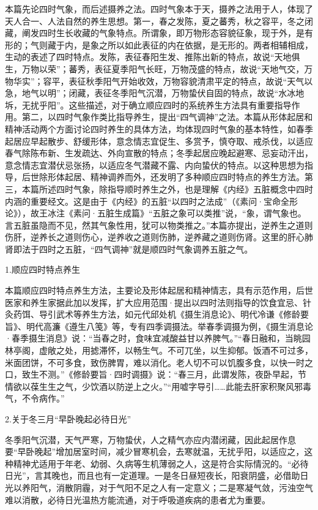 \documentclass[draft,12pt]{ctexbook}
\begin{document}


本篇先论四时气象，而后述摄养之法。四时气象本于天，摄养之法用于人，体现了天人合一、人法自然的养生思想。第一，春之发陈，夏之蕃秀，秋之容平，冬之闭藏，阐发四时生长收藏的气象特点。所谓象，即万物形态容貌征象，现于外，是有形的；气则藏于内，是象之所以如此表征的内在依据，是无形的。两者相辅相成，生动的表述了四时特点。发陈，表征春阳生发、推陈出新的特点，故说“天地俱生，万物以荣”；蕃秀，表征夏季阳气长旺，万物茂盛的特点，故说“天地气交，万物华实”；容平，表征秋季阳气开始收效，万物容貌清肃平定的特点，故说“天气以急，地气以明”；闭藏，表征冬季阳气沉潜，万物蛰伏自固的特点，故说“水冰地坼，无扰乎阳”。这些描述，对于确立顺应四时的系统养生方法具有重要指导作用。第二，以四时气象作类比指导养生，提出“四气调神”之法。本篇从形体起居和精神活动两个方面讨论四时养生的具体方法，均体现四时气象的基本特性，如春季起居应早起散步、舒缓形体，意念情志宜促生、多赏予，慎夺取、戒杀伐，以适应春气除陈布新、生发疏达、外向宣散的特点；冬季起居应晚起避寒、忌妄动汗出，意念情志宜潜伏忌张扬，以适应冬气潜藏不露、内向蛰伏的特点。以这种思想为指导，后世除形体起居、精神调养而外，还发明了多种顺应四时特点的养生方法。第三，本篇所述四时气象，除指导顺时养生之外，也是理解《内经》五脏概念中四时内涵的重要经文。这是由于《内经》的五脏“以四时之法成”（《素问·宝命全形论》），故王冰注《素问·五脏生成篇》“五脏之象可以类推”说，“象，谓气象也。言五脏虽隐而不见，然其气象性用，犹可以物类推之。”本篇亦提出，逆养生之道则伤肝，逆养长之道则伤心，逆养收之道则伤肺，逆养藏之道则伤肾。这里的肝心肺肾即法于四时之五脏，“四气调神”就是顺四时气象调养五脏之气。


1.顺应四时特点养生

本篇顺应四时特点养生方法，主要论及形体起居和精神情志，具有示范作用，后世医家和养生家据此加以发挥，扩大应用范围·提出以四时法则指导的饮食宜忌、针灸药饵、导引武术等养生方法，如元代邱处机《摄生消息论》、明代冷谦《修龄要旨》、明代高濂《遵生八笺》等，专有四季调摄法。举春季调摄为例，《摄生消息论·春季摄生消息》说：“当春之时，食味宜减酸益甘以养脾气。”“春日融和，当眺园林亭阁，虚敞之处，用摅滞怀，以畅生气。不可兀坐，以生抑郁。饭酒不可过多，米面团饼，不可多食，致伤脾胃，难以消化。老人切不可以饥腹多食，以快一时之口，致生不测。”《修龄要旨·四时调摄》说：“春三月，此谓发陈，夜卧早起，节情欲以葆生生之气，少饮酒以防逆上之火。”“用嘘字导引……此能去肝家积聚风邪毒气，不令病作。”

2.关于冬三月“早卧晚起必待日光”

冬季阳气沉潜，天气严寒，万物蛰伏，人之精气亦应内潜闭藏，因此起居作息要“早卧晚起”增加居室时间，减少冒寒机会，去寒就温，无扰乎阳，以适应之，这种精神尤适用于年老、幼弱、久病等生机薄弱之人，这是符合实际情況的。“必待日光”，言其晚也，而且也有一定道理。一是冬日昼短夜长，阳衰阴盛，必借助日光以养阳气，消散阴霾，对于气阳不足之人有一定意义；二是寒凝气敛，污浊空气难以消散，必待日光温热方能流通，对于呼吸道疾病的患者尤为重要。
\end{document}
